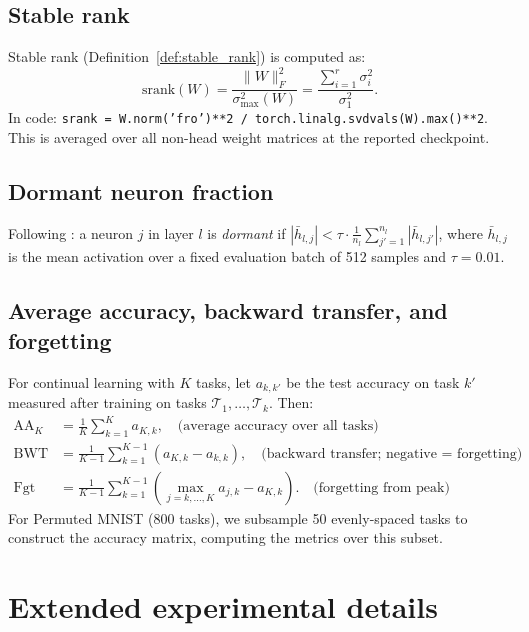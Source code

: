 \documentclass{article}
\newcommand{\cT}{\mathcal{T}}
\begin{document}
\subsection{Stable rank}

Stable rank (Definition~\ref{def:stable_rank}) is computed as:
\[
\mathrm{srank}(W) = \frac{\|W\|_F^2}{\sigma_{\max}^2(W)} = \frac{\sum_{i=1}^r \sigma_i^2}{\sigma_1^2}.
\]
In code: \texttt{srank = W.norm('fro')**2 / torch.linalg.svdvals(W).max()**2}. This is averaged over all non-head weight matrices at the reported checkpoint.

\subsection{Dormant neuron fraction}

Following \citet{sokar2023dormant}: a neuron $j$ in layer $l$ is \emph{dormant} if $|\bar{h}_{l,j}| < \tau \cdot \frac{1}{n_l}\sum_{j'=1}^{n_l} |\bar{h}_{l,j'}|$, where $\bar{h}_{l,j}$ is the mean activation over a fixed evaluation batch of 512 samples and $\tau = 0.01$.

\subsection{Average accuracy, backward transfer, and forgetting}

For continual learning with $K$ tasks, let $a_{k,k'}$ be the test accuracy on task $k'$ measured after training on tasks $\cT_1,\ldots,\cT_k$. Then:
\begin{align*}
\mathrm{AA}_K &= \frac{1}{K}\sum_{k=1}^K a_{K,k}, \quad \text{(average accuracy over all tasks)}\\
\mathrm{BWT} &= \frac{1}{K-1}\sum_{k=1}^{K-1}(a_{K,k} - a_{k,k}), \quad \text{(backward transfer; negative = forgetting)}\\
\mathrm{Fgt} &= \frac{1}{K-1}\sum_{k=1}^{K-1}\left(\max_{j=k,\ldots,K} a_{j,k} - a_{K,k}\right). \quad \text{(forgetting from peak)}
\end{align*}
For Permuted MNIST (800 tasks), we subsample 50 evenly-spaced tasks to construct the accuracy matrix, computing the metrics over this subset.

\section{Extended experimental details}
\label{app:hyperparams}
\end{document}
